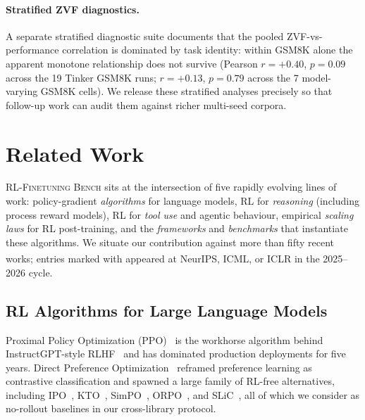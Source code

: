 \documentclass{article}
\newcommand{\ours}{\textsc{RL-Finetuning Bench}}
\begin{document}
\paragraph{Stratified ZVF diagnostics.}
A separate stratified diagnostic suite documents that the pooled
ZVF-vs-performance correlation is dominated by task identity: within
GSM8K alone the apparent monotone relationship does not survive
(Pearson $r=+0.40$, $p=0.09$ across the 19 Tinker GSM8K runs;
$r=+0.13$, $p=0.79$ across the 7 model-varying GSM8K cells). We
release these stratified analyses precisely so that follow-up work can
audit them against richer multi-seed corpora.
 


\section{Related Work}
\label{sec:related}

\ours{} sits at the intersection of five rapidly evolving lines of work:
policy-gradient \emph{algorithms} for language models, RL for \emph{reasoning}
(including process reward models), RL for \emph{tool use} and agentic behaviour,
empirical \emph{scaling laws} for RL post-training, and the \emph{frameworks}
and \emph{benchmarks} that instantiate these algorithms. We situate our
contribution against more than fifty recent works; entries marked with
\textsuperscript{\dag} appeared at NeurIPS, ICML, or ICLR in the 2025--2026 cycle.

\subsection{RL Algorithms for Large Language Models}
\label{sec:related:algos}

Proximal Policy Optimization (PPO)~\cite{schulman2017proximal} is the workhorse
algorithm behind InstructGPT-style RLHF~\cite{ouyang2022training, christiano2017deeprlhf, stiennon2020summarize, bai2022hhrlhf, bai2022claudecai}
and has dominated production deployments for five years. Direct Preference
Optimization~\cite{rafailov2024direct} reframed preference learning as
contrastive classification and spawned a large family of RL-free alternatives,
including IPO~\cite{azar2024ipo}, KTO~\cite{ethayarajh2024kto},
SimPO~\cite{meng2024simpo}, ORPO~\cite{hong2024orpo}, and
SLiC~\cite{zhao2023slic}, all of which we consider as no-rollout baselines in
our cross-library protocol.
\end{document}
